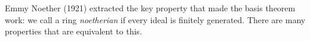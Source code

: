 Emmy Noether (1921) extracted the key property that made the basis theorem
work: we call a ring \emph{noetherian} if every ideal is finitely generated.
There are many properties that are equivalent to this.
